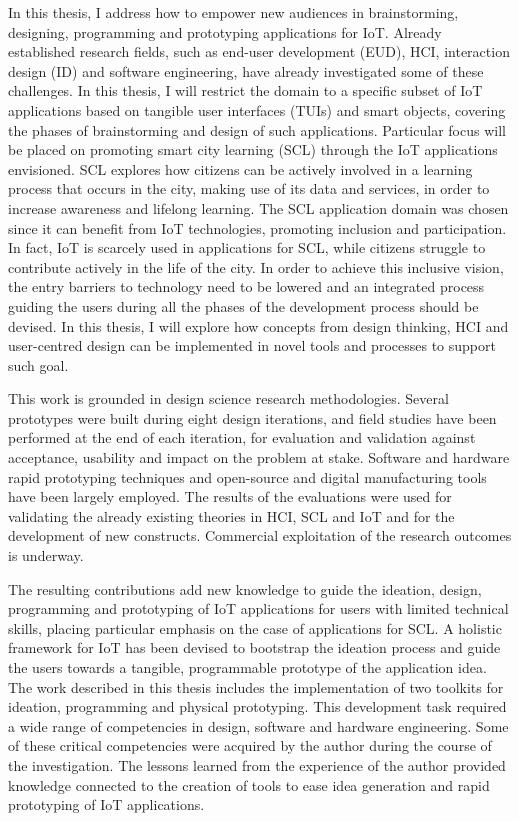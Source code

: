 In this thesis, I address how to empower new audiences in brainstorming, designing, programming and prototyping applications for IoT. Already established research fields, such as end-user development (EUD), HCI, interaction design (ID) and software engineering, have already investigated some of these challenges. In this thesis, I will restrict the domain to a specific subset of IoT applications based on tangible user interfaces (TUIs) and smart objects, covering the phases of brainstorming and design of such applications. Particular focus will be placed on promoting smart city learning (SCL) through the IoT applications envisioned. SCL explores how citizens can be actively involved in a learning process that occurs in the city, making use of its data and services, in order to increase awareness and lifelong learning. The SCL application domain was chosen since it can benefit from IoT technologies, promoting inclusion and participation. In fact, IoT is scarcely used in applications for SCL, while citizens struggle to contribute actively in the life of the city. In order to achieve this inclusive vision, the entry barriers to technology need to be lowered and an integrated process guiding the users during all the phases of the development process should be devised. In this thesis, I will explore how concepts from design thinking, HCI and user-centred design can be implemented in novel tools and processes to support such goal.

This work is grounded in design science research methodologies. Several prototypes were built during eight design iterations, and field studies have been performed at the end of each iteration, for evaluation and validation against acceptance, usability and impact on the problem at stake. Software and hardware rapid prototyping techniques and open-source and digital manufacturing tools have been largely employed. The results of the evaluations were used for validating the already existing theories in HCI, SCL and IoT and for the development of new constructs. Commercial exploitation of the research outcomes is underway.

The resulting contributions add new knowledge to guide the ideation, design, programming and prototyping of IoT applications for users with limited technical skills, placing particular emphasis on the case of applications for SCL. A holistic framework for IoT has been devised to bootstrap the ideation process and guide the users towards a tangible, programmable prototype of the application idea. The work described in this thesis includes the implementation of two toolkits for ideation, programming and physical prototyping. This development task required a wide range of competencies in design, software and hardware engineering. Some of these critical competencies were acquired by the author during the course of the investigation. The lessons learned from the experience of the author provided knowledge connected to the creation of tools to ease idea generation and rapid prototyping of IoT applications.
